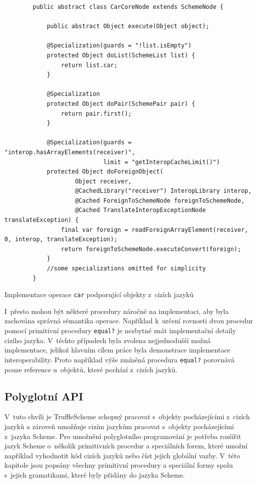 \documentclass[
  master,
  biblatex,
  figures=true,
  theorems,
  sourcecodes,
  glossaries,
  index
]{kidiplom}
\begin{document}
 \begin{listing} [H]
    \begin{verbatim}
        public abstract class CarCoreNode extends SchemeNode {
    
            public abstract Object execute(Object object);
    
            @Specialization(guards = "!list.isEmpty")
            protected Object doList(SchemeList list) {
                return list.car;
            }
    
            @Specialization
            protected Object doPair(SchemePair pair) {
                return pair.first();
            }
    
            @Specialization(guards = "interop.hasArrayElements(receiver)",
                            limit = "getInteropCacheLimit()")
            protected Object doForeignObject(
                    Object receiver,
                    @CachedLibrary("receiver") InteropLibrary interop,
                    @Cached ForeignToSchemeNode foreignToSchemeNode,
                    @Cached TranslateInteropExceptionNode translateException) {
                final var foreign = readForeignArrayElement(receiver, 0, interop, translateException);
                return foreignToSchemeNode.executeConvert(foreign);
            }
            //some specializations omitted for simplicity
        }
    \end{verbatim}
    \caption{Implementace operace \texttt{car} podporující objekty z~cizích jazyků}
    \label{CarCoreNode}
\end{listing}
 
 I~přesto mohou být některé procedury náročné na implementaci, aby byla zachována správná sémantika operace. Například k~určení rovnosti dvou procedur pomocí primitivní procedury \texttt{equal?} je nezbytné znát implementační detaily cizího jazyka. V~těchto případech byla zvolena nejjednodušší možná implementace, jelikož hlavním cílem práce byla demonstrace implementace interoperability. Proto například výše zmíněná procedura \texttt{equal?} porovnává pouze reference u~objektů, které pochází z~cizích jazyků. 
 

\subsection{Polyglotní API}
V~tuto chvíli je TruffleScheme schopný pracovat s~objekty pocházejícími z~cizích jazyků a zároveň umožňuje cizím jazykům pracovat s~objekty pocházejícími z~jazyka Scheme. Pro umožnění polyglotního programování je potřeba rozšířit jazyk Scheme o~několik primitivních procedur a speciálních forem, které umožní například vyhodnotit kód cizích jazyků nebo číst jejich globální vazby. V~této kapitole jsou popsány všechny primitivní procedury a speciální formy spolu s~jejich gramatikami, které byly přidány do jazyka Scheme. 
\end{document}
